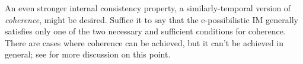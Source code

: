 \documentclass[a4paper, 12pt]{article}
\theoremstyle{plain}
\theoremstyle{definition}
\theoremstyle{remark}
\newcommand{\uPi}{\overline{\Pi}}
\begin{document}
An even stronger internal consistency property, a similarly-temporal version of {\em coherence}, might be desired.  Suffice it to say that the e-possibilistic IM generally satisfies only one of the two necessary and sufficient conditions \citet[][Sec.~6.5.2]{walley1991} for coherence.  There are cases where coherence can be achieved, but it can't be achieved in general; see \citet[][Sec.~3.3]{martin.partial} for more discussion on this point. 



\end{document}
